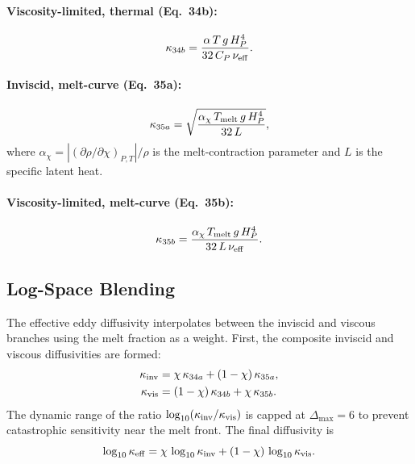 \documentclass{aastex631}
\newcommand{\pp}{\partial}
\newcommand{\Hp}{H_P}
\newcommand{\Cp}{C_P}
\newcommand{\Tmelt}{T_{\rm melt}}
\begin{document}
\paragraph{Viscosity-limited, thermal (Eq.~34b):}
\begin{equation}\label{eq:kappa34b}
  \kappa_{34b}
  = \frac{\alpha\,T\,g\,\Hp^4}{32\,\Cp\,\nu_{\rm eff}}.
\end{equation}

\paragraph{Inviscid, melt-curve (Eq.~35a):}
\begin{equation}\label{eq:kappa35a}
  \kappa_{35a}
  = \sqrt{\frac{\alpha_\chi\,\Tmelt\,g\,\Hp^4}{32\,L}},
\end{equation}
where $\alpha_\chi = |(\pp\rho/\pp\chi)_{P,T}|/\rho$ is the
melt-contraction parameter and $L$ is the specific latent heat.

\paragraph{Viscosity-limited, melt-curve (Eq.~35b):}
\begin{equation}\label{eq:kappa35b}
  \kappa_{35b}
  = \frac{\alpha_\chi\,\Tmelt\,g\,\Hp^4}{32\,L\,\nu_{\rm eff}}.
\end{equation}

\subsection{Log-Space Blending}

The effective eddy diffusivity interpolates between the inviscid and
viscous branches using the melt fraction as a weight.  First, the
composite inviscid and viscous diffusivities are formed:
\begin{align}
  \kappa_{\rm inv}
  &= \chi\,\kappa_{34a} + (1-\chi)\,\kappa_{35a},
  \label{eq:kappa_inv}\\
  \kappa_{\rm vis}
  &= (1-\chi)\,\kappa_{34b} + \chi\,\kappa_{35b}.
  \label{eq:kappa_vis}
\end{align}
The dynamic range of the ratio
$\log_{10}(\kappa_{\rm inv}/\kappa_{\rm vis})$ is capped at
$\Delta_{\max}=6$ to prevent catastrophic sensitivity near the melt front.
The final diffusivity is
\begin{equation}\label{eq:kappa_eff}
  \log_{10}\kappa_{\rm eff}
  = \chi\,\log_{10}\kappa_{\rm inv}
  + (1-\chi)\,\log_{10}\kappa_{\rm vis}.
\end{equation}
\end{document}
